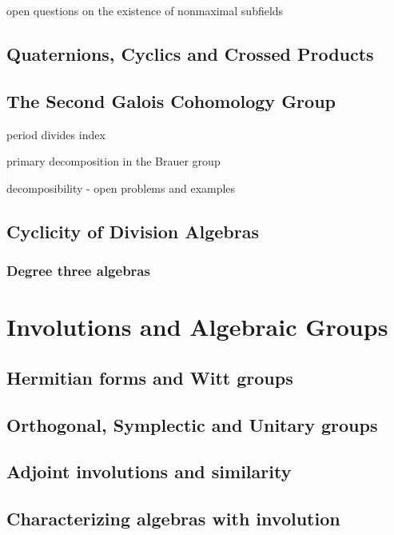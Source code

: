 \documentclass[12pt]{report}
\theoremstyle{plain}
\newcommand{\todo}[1]{\textcolor{todo}{#1}}
\begin{document}
\iffalse

\todo{open questions on the existence of nonmaximal subfields}

\section{Quaternions, Cyclics and Crossed Products}

\section{The Second Galois Cohomology Group}

\todo{period divides index}

\todo{primary decomposition in the Brauer group}

\todo{decomposibility - open problems and examples}

\section{Cyclicity of Division Algebras}

\subsection{Degree three algebras}


\chapter{Involutions and Algebraic Groups}

\section{Hermitian forms and Witt groups}

\section{Orthogonal, Symplectic and Unitary groups}

\section{Adjoint involutions and similarity}

\section{Characterizing algebras with involution}
\end{document}
